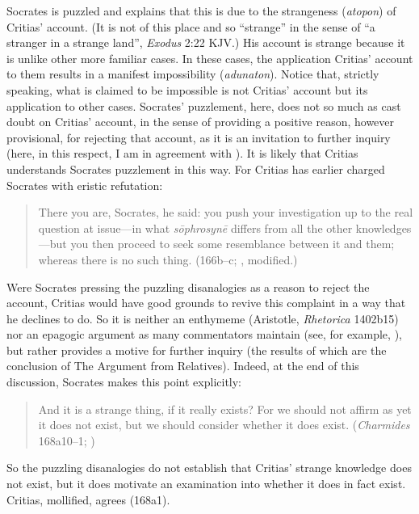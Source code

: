 Socrates is puzzled and explains that this is due to the strangeness (\emph{atopon}) of  Critias' account. (It is not of this place and so ``strange'' in the sense of ``a stranger in a strange land'', \emph{Exodus} 2:22 KJV.) His account is strange because it is unlike other more familiar cases. In these cases, the application Critias' account to them results in a manifest impossibility (\emph{adunaton}). Notice that, strictly speaking, what is claimed to be impossible is not Critias' account but its application to other cases. Socrates' puzzlement, here, does not so much as cast doubt on Critias' account, in the sense of providing a positive reason, however provisional, for rejecting that account, as it is an invitation to further inquiry (here, in this respect, I am in agreement with \citealt{Politis:2008nv}). It is likely that Critias understands Socrates puzzlement in this way. For Critias has earlier charged Socrates with eristic refutation:
\begin{quote}
	There you are, Socrates, he said: you push your investigation up to the real question at issue—in what \emph{sōphrosynē} differs from all the other knowledges—but you then proceed to seek some resemblance between it and them; whereas there is no such thing. (166b–c; \citealt[53]{Lamb:1927qw}, modified.)
\end{quote}	
Were Socrates pressing the puzzling disanalogies as a reason to reject the account, Critias would have good grounds to revive this complaint in a way that he declines to do. So it is neither an enthymeme (Aristotle, \emph{Rhetorica} 1402b15) nor an epagogic argument as many commentators maintain (see, for example, \citealt[41]{Robinson:1941yb}), but rather provides a motive for further inquiry (the results of which are the conclusion of The Argument from Relatives). Indeed, at the end of this discussion, Socrates makes this point explicitly:
\begin{quote}
	And it is a strange thing, if it really exists? For we should not affirm as yet it does not exist, but we should consider whether it does exist. (\emph{Charmides} 168a10–1; \citealt[61]{Lamb:1927qw})
\end{quote}
So the puzzling disanalogies do not establish that Critias' strange knowledge does not exist, but it does motivate an examination into whether it does in fact exist. Critias, mollified, agrees (168a1).


